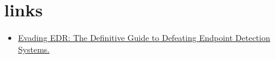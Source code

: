 \section{links}

\begin{itemize}
    \item \href{https://books.google.fr/books?id=anO1EAAAQBAJ&printsec=frontcover&hl=fr#v=onepage&q&f=false}{Evading EDR: The Definitive Guide to Defeating Endpoint Detection Systems.}
\end{itemize}
